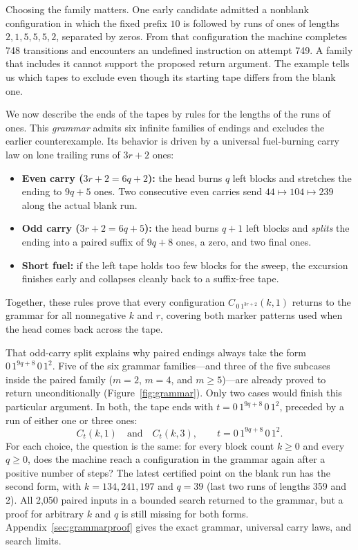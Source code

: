 \documentclass[11pt]{article}
\DeclareRobustCommand{\_}{\ifmmode\sb\else\textunderscore\allowbreak\fi}
\theoremstyle{definition}
\theoremstyle{remark}
\begin{document}
Choosing the family matters. One early candidate admitted a nonblank configuration in which the fixed prefix $10$ is followed by runs of ones of lengths $2,1,5,5,5,2$, separated by zeros. From that configuration the machine completes 748 transitions and encounters an undefined instruction on attempt 749. A family that includes it cannot support the proposed return argument. The example tells us which tapes to exclude even though its starting tape differs from the blank one.

We now describe the ends of the tapes by rules for the lengths of the runs of ones. This \emph{grammar} admits six infinite families of endings and excludes the earlier counterexample. Its behavior is driven by a universal fuel-burning carry law on lone trailing runs of $3r+2$ ones:
\begin{itemize}[leftmargin=1.4em,itemsep=2pt,topsep=3pt]
  \item \textbf{Even carry ($3r+2=6q+2$):} the head burns $q$ left blocks and stretches the ending to $9q+5$ ones. Two consecutive even carries send $44\mapsto104\mapsto239$ along the actual blank run.
  \item \textbf{Odd carry ($3r+2=6q+5$):} the head burns $q+1$ left blocks and \emph{splits} the ending into a paired suffix of $9q+8$ ones, a zero, and two final ones.
  \item \textbf{Short fuel:} if the left tape holds too few blocks for the sweep, the excursion finishes early and collapses cleanly back to a suffix-free tape.
\end{itemize}
Together, these rules prove that every configuration $C_{\,0\,1^{3r+2}}(k,1)$ returns to the grammar for all nonnegative $k$ and $r$, covering both marker patterns used when the head comes back across the tape.

That odd-carry split explains why paired endings always take the form $0\,1^{9q+8}\,0\,1^2$. Five of the six grammar families---and three of the five subcases inside the paired family ($m=2$, $m=4$, and $m\ge5$)---are already proved to return unconditionally (Figure~\ref{fig:grammar}). Only two cases would finish this particular argument. In both, the tape ends with $t=0\,1^{9q+8}\,0\,1^2$, preceded by a run of either one or three ones:
\[
 C_t(k,1)\quad\text{and}\quad C_t(k,3),\qquad
 t=0\,1^{9q+8}\,0\,1^2 .
\]
For each choice, the question is the same: for every block count $k\ge0$ and every $q\ge0$, does the machine reach a configuration in the grammar again after a positive number of steps? The latest certified point on the blank run has the second form, with $k=134{,}241{,}197$ and $q=39$ (last two runs of lengths 359 and 2). All 2,050 paired inputs in a bounded search returned to the grammar, but a proof for arbitrary $k$ and $q$ is still missing for both forms. Appendix~\ref{sec:grammarproof} gives the exact grammar, universal carry laws, and search limits.
\end{document}
